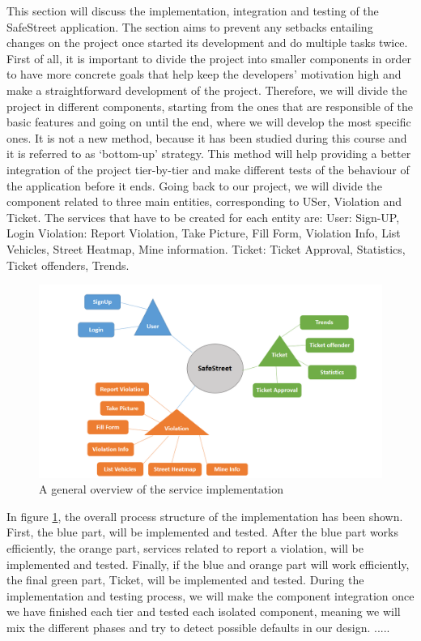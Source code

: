 This section will discuss the implementation, integration and testing of the SafeStreet application. The section aims to prevent any setbacks entailing changes on the project once started its development and do multiple tasks twice. First of all, it is important to divide the project into smaller components in order to have more concrete goals that help keep the developers’ motivation high and make a straightforward development of the project. Therefore, we will divide the project in diﬀerent components, starting from the ones that are responsible of the basic features and going on until the end, where we will develop the most speciﬁc ones. It is not a new method, because it has been studied during this course and it is referred to as ‘bottom-up’ strategy. This method will help providing a better integration of the project tier-by-tier and make diﬀerent tests of the behaviour of the application before it ends. Going back to our project, we will divide the component related to three main entities, corresponding to USer, Violation and Ticket.
The services that have to be created for each entity are:
User: Sign-UP, Login
Violation: Report Violation, Take Picture, Fill Form, Violation Info, List Vehicles, Street Heatmap, Mine information.
Ticket: Ticket Approval, Statistics, Ticket offenders, Trends.

\begin{figure}
\centering
\includegraphics[width=\textwidth]{Images/ImplemetationandTest.png}
\caption{\label{fig:Test} A general overview of the service implementation}
\end{figure}

In ﬁgure \ref{fig:Test}, the overall process structure of the implementation has been shown. First, the blue part, will be implemented and tested. After the blue part works eﬃciently, the orange part, services related to report a violation, will be implemented and tested. Finally, if the blue and orange part will work eﬃciently, the ﬁnal green part, Ticket, will be implemented and tested. During the implementation and testing process, we will make the component integration once we have ﬁnished each tier and tested each isolated component, meaning we will mix the diﬀerent phases and try to detect possible defaults in our design.
..... 
